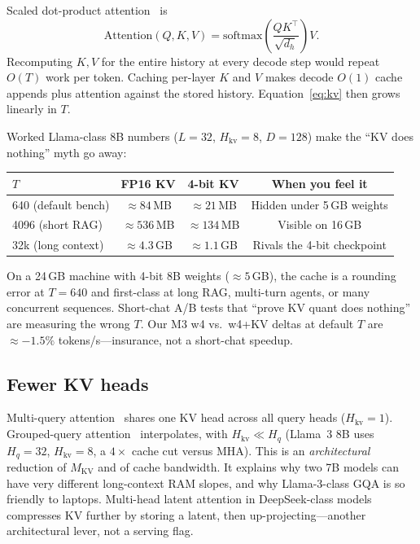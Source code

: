 Scaled dot-product attention~\citep{vaswani2017attention} is
\begin{equation}
  \mathrm{Attention}(Q,K,V)=\mathrm{softmax}\!\left(\frac{QK^{\top}}{\sqrt{d_h}}\right)V.
\end{equation}
Recomputing \(K,V\) for the entire history at every decode step would repeat \(O(T)\) work per token. Caching per-layer \(K\) and \(V\) makes decode \(O(1)\) cache appends plus attention against the stored history. Equation~\eqref{eq:kv} then grows linearly in \(T\).

Worked Llama-class 8B numbers (\(L=32\), \(H_{\mathrm{kv}}=8\), \(D=128\)) make the ``KV does nothing'' myth go away:

\begin{center}
\small
\begin{tabular}{@{}lccc@{}}
  \toprule
  \(T\) & FP16 KV & 4-bit KV & When you feel it \\
  \midrule
  640 (default bench) & \(\approx 84\)\,MB & \(\approx 21\)\,MB & Hidden under 5\,GB weights \\
  4096 (short RAG) & \(\approx 536\)\,MB & \(\approx 134\)\,MB & Visible on 16\,GB \\
  32k (long context) & \(\approx 4.3\)\,GB & \(\approx 1.1\)\,GB & Rivals the 4-bit checkpoint \\
  \bottomrule
\end{tabular}
\end{center}

On a 24\,GB machine with 4-bit 8B weights ($\approx 5$\,GB), the cache is a rounding error at \(T=640\) and first-class at long RAG, multi-turn agents, or many concurrent sequences. Short-chat A/B tests that ``prove KV quant does nothing'' are measuring the wrong \(T\). Our M3 w4 vs.\ w4+KV deltas at default \(T\) are \(\approx -1.5\%\) tokens/s---insurance, not a short-chat speedup.

\subsection{Fewer KV heads}

Multi-query attention~\citep{shazeer2019mqa} shares one KV head across all query heads (\(H_{\mathrm{kv}}=1\)). Grouped-query attention~\citep{ainslie2023gqa} interpolates, with \(H_{\mathrm{kv}} \ll H_q\) (Llama~3 8B uses \(H_q=32\), \(H_{\mathrm{kv}}=8\), a \(4\times\) cache cut versus MHA). This is an \emph{architectural} reduction of \(M_{\mathrm{KV}}\) and of cache bandwidth. It explains why two 7B models can have very different long-context RAM slopes, and why Llama-3-class GQA is so friendly to laptops. Multi-head latent attention in DeepSeek-class models~\citep{liu2024deepseek} compresses KV further by storing a latent, then up-projecting---another architectural lever, not a serving flag.


